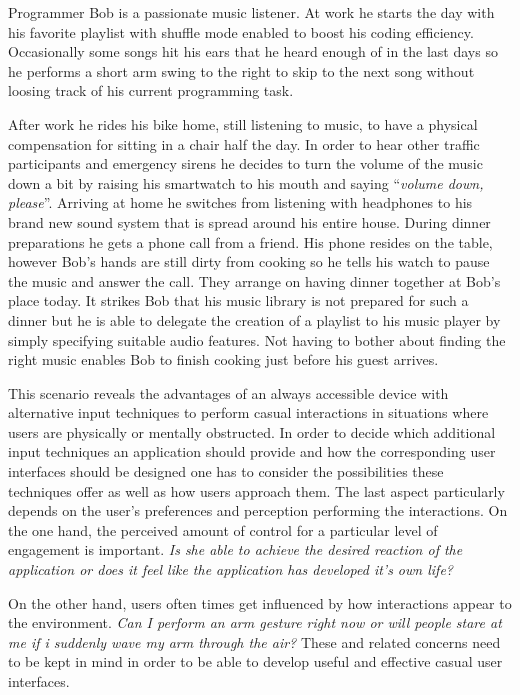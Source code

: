 \begin{addmargin}[1cm]{1cm}\label{bobscenario}
Programmer Bob is a passionate music listener. At work he starts the day with his favorite playlist with shuffle mode enabled to boost his coding efficiency. Occasionally some songs hit his ears that he heard enough of in the last days so he performs a short arm swing to the right to skip to the next song without loosing track of his current programming task. 

After work he rides his bike home, still listening to music, to have a physical compensation for sitting in a chair half the day. In order to hear other traffic participants and emergency sirens he decides to turn the volume of the music down a bit by raising his smartwatch to his mouth and saying ``\textit{volume down, please}''. Arriving at home he switches from listening with headphones to his brand new sound system that is spread around his entire house. During dinner preparations he gets a phone call from a friend. His phone resides on the table, however Bob's hands are still dirty from cooking so he tells his watch to pause the music and answer the call. They arrange on having dinner together at Bob's place today. It strikes Bob that his music library is not prepared for such a dinner but he is able to delegate the creation of a playlist to his music player by simply specifying suitable audio features. Not having to bother about finding the right music enables Bob to finish cooking just before his guest arrives.\\
\end{addmargin}

This scenario reveals the advantages of an always accessible device with alternative input techniques to perform casual interactions in situations where users are physically or mentally obstructed. In order to decide which additional input techniques an application should provide and how the corresponding user interfaces should be designed one has to consider the possibilities these techniques offer as well as how users approach them. The last aspect particularly depends on the user's preferences and perception performing the interactions. On the one hand, the perceived amount of control for a particular level of engagement is important. \textit{Is she able to achieve the desired reaction of the application or does it feel like the application has developed it's own life?}

On the other hand, users often times get influenced by how interactions appear to the environment. \textit{Can I perform an arm gesture right now or will people stare at me if i suddenly wave my arm through the air?}
These and related concerns need to be kept in mind in order to be able to develop useful and effective casual user interfaces.

